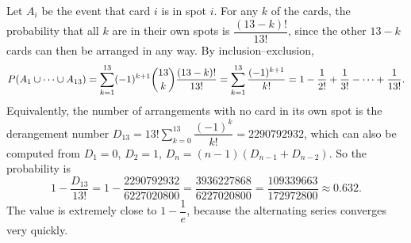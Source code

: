 Let $A_i$ be the event that card $i$ is in spot $i$. For any $k$ of the cards, the probability that all $k$ are in their own spots is $\dfrac{(13-k)!}{13!}$, since the other $13-k$ cards can then be arranged in any way. By inclusion--exclusion,
\[
P(A_1\cup\cdots\cup A_{13})=\sum_{k=1}^{13}(-1)^{k+1}\dbinom{13}{k}\dfrac{(13-k)!}{13!}=\sum_{k=1}^{13}\dfrac{(-1)^{k+1}}{k!}
=1-\dfrac{1}{2!}+\dfrac{1}{3!}-\cdots+\dfrac{1}{13!}.
\]
Equivalently, the number of arrangements with no card in its own spot is the derangement number $D_{13}=13!\sum_{k=0}^{13}\dfrac{(-1)^k}{k!}=2290792932$, which can also be computed from $D_1=0$, $D_2=1$, $D_n=(n-1)(D_{n-1}+D_{n-2})$. So the probability is
\[
1-\dfrac{D_{13}}{13!}=1-\dfrac{2290792932}{6227020800}=\dfrac{3936227868}{6227020800}=\boxed{\dfrac{109339663}{172972800}}\approx0.632 .
\]
The value is extremely close to $1-\dfrac{1}{e}$, because the alternating series converges very quickly.
